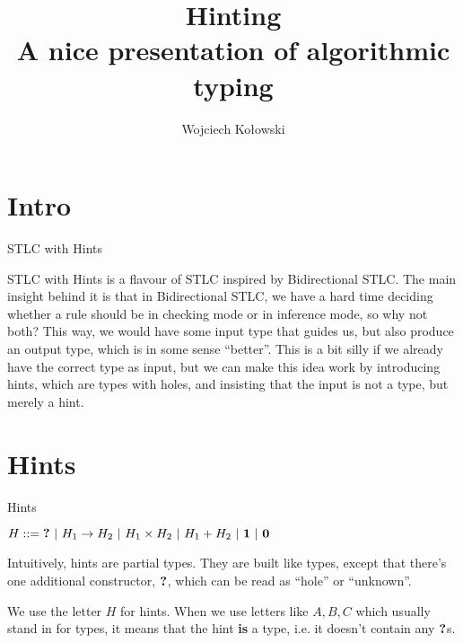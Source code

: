 \documentclass{beamer}
\title{Hinting\\A nice presentation of algorithmic typing}
\author{Wojciech Kołowski}
\date{}
\begin{document}
\frame{\titlepage}

\section{Intro}

\begin{frame}{STLC with Hints}

STLC with Hints is a flavour of STLC inspired by Bidirectional STLC. The main insight behind it is that in Bidirectional STLC, we have a hard time deciding whether a rule should be in checking mode or in inference mode, so why not both? This way, we would have some input type that guides us, but also produce an output type, which is in some sense ``better''. This is a bit silly if we already have the correct type as input, but we can make this idea work by introducing hints, which are types with holes, and insisting that the input is not a type, but merely a hint.

\end{frame}

\section{Hints}

\begin{frame}{Hints}

$H ::= \textbf{?} \ |\  H_1 \to H_2 \ |\  H_1 \times H_2 \ |\  H_1 + H_2 \ |\  \textbf{1} \ |\  \textbf{0}$

\vspace{2em}

Intuitively, hints are partial types. They are built like types, except that there's one additional constructor, $\textbf{?}$, which can be read as ``hole'' or ``unknown''.

\vspace{2em}

We use the letter $H$ for hints. When we use letters like $A, B, C$ which usually stand in for types, it means that the hint \textbf{is} a type, i.e. it doesn't contain any $\textbf{?}$s.

\end{frame}
\end{document}
